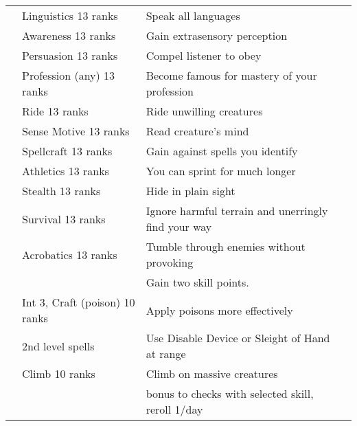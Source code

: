 {\begin{longtabu}{>{\lcol}p{10em} >{\lcol}p{15em} >{\lcol}X >{\lcol}p{3em}}
         & Linguistics 13 ranks & Speak all languages &  \\
         & Awareness 13 ranks & Gain extrasensory perception &  \\
         & Persuasion 13 ranks & Compel listener to obey &  \\
         & Profession (any) 13 ranks & Become famous for mastery of your profession &  \\
         & Ride 13 ranks & Ride unwilling creatures &  \\
         & Sense Motive 13 ranks & Read creature's mind &  \\
         & Spellcraft 13 ranks & Gain  against spells you identify &  \\
         & Athletics 13 ranks & You can sprint for much longer &  \\
         & Stealth 13 ranks & Hide in plain sight &  \\
         & Survival 13 ranks & Ignore harmful terrain and unerringly find your way &  \\
         & Acrobatics 13 ranks & Tumble through enemies without provoking &  \\
         & \x & Gain two skill points.
        &  \\
         & Int 3, Craft (poison) 10 ranks & Apply poisons more effectively &  \\
         &  2nd level spells & Use Disable Device or Sleight of Hand at range &  \\
         & Climb 10 ranks & Climb on massive creatures &  \\
         & \x &   bonus to checks with selected skill, reroll 1/day &  \\

\end{longtabu}}
